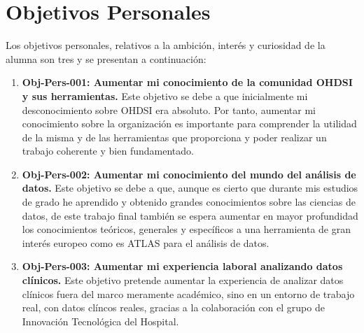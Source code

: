 \section{Objetivos Personales} \label{sec:02objPersonal}

Los objetivos personales, relativos a la ambición, interés y curiosidad de la alumna son tres y se presentan a continuación:

%

\begin{enumerate}

    \item \textbf{Obj-Pers-001: Aumentar mi conocimiento de la comunidad OHDSI y sus herramientas.} Este objetivo se debe a que inicialmente mi desconocimiento sobre  OHDSI era absoluto. Por tanto, aumentar mi conocimiento sobre la organización es importante para comprender la utilidad de la misma y de las herramientas que proporciona y poder realizar un trabajo coherente y bien fundamentado.

    \item \textbf{Obj-Pers-002: Aumentar mi conocimiento del mundo del análisis de datos.} Este objetivo se debe a que, aunque es cierto que durante mis estudios de grado he aprendido y obtenido grandes conocimientos sobre las ciencias de datos, de este trabajo final también se espera aumentar en mayor profundidad los conocimientos teóricos, generales y específicos a una herramienta de gran interés europeo como es ATLAS para el análisis de datos.

    \item \textbf{Obj-Pers-003: Aumentar mi experiencia laboral analizando datos clínicos.} Este objetivo pretende aumentar la experiencia de analizar datos clínicos fuera del marco meramente académico, sino en un entorno de trabajo real, con datos clíncos reales, gracias a la colaboración con el grupo de Innovación Tecnológica del Hospital.
    
\end{enumerate}



